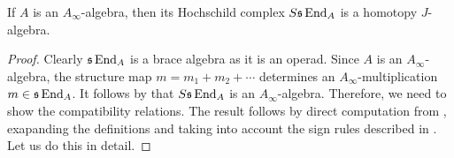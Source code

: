 \documentclass[Thesis.tex]{subfiles}
\begin{document}
\begin{corollary}\label{ainftydeligne}
If $A$ is an $A_\infty$-algebra, then its Hochschild complex $S\mathfrak{s}\operatorname{End}_A$ is a homotopy $J$-algebra.
\end{corollary}
\begin{proof}
 Clearly $\mathfrak{s}\operatorname{End}_A$ is a brace algebra as it is an operad. Since $A$ is an $A_\infty$-algebra, the structure map $m=m_1+m_2+\cdots$ determines an $A_\infty$-multiplication $m\in\mathfrak{s}\operatorname{End}_A$. It follows by  that $S\mathfrak{s}\operatorname{End}_A$ is an $A_\infty$-algebra. Therefore, we need to show the compatibility relations. The result follows by direct computation from , exapanding the definitions and taking into account the sign rules described in . Let us do this in detail. 
 

\end{proof}
\end{document}
